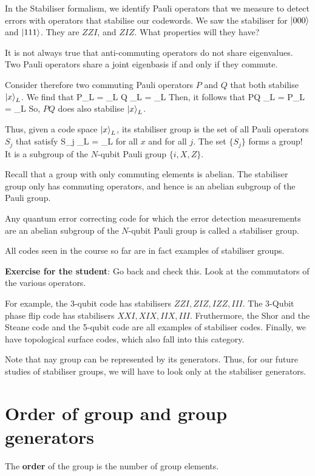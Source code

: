 In the Stabiliser formalism, we identify Pauli operators that we measure to detect errors with operators that stabilise our codewords. We saw the stabiliser for $\ket{000}$ and $\ket{111}$. They are $ZZI$, and $ZIZ$. What properties will they have? 

It is not always true that anti-commuting operators do not share eigenvalues. Two Pauli operators share a joint eigenbasis if and only if they commute. 

Consider therefore two commuting Pauli operators $P$ and $Q$ that both stabilise $\ket{x}_L$. We find that 
\beq
P_L = _L
\eeq
\beq
Q _L = _L
\eeq
Then, it follows that 
\beq
PQ _L = P_L = _L
\eeq
So, $PQ$ does also stabilise $\ket{x}_L$. 

Thus, given a code space $\ket{x}_L$, its stabiliser group is the set of all Pauli operators $S_j$ that satisfy
\beq
S_j _L = _L
\eeq
for all $x$ and for all $j$. The set $\{S_j\}$ forms a group! It is a subgroup of the $N$-qubit Pauli group $\{i, X, Z\}$. 

Recall that a group with only commuting elements is abelian. The stabiliser group only has commuting operators, and hence is an abelian subgroup of the Pauli group. 

Any quantum error correcting code for which the error detection measurements are an abelian subgroup of the $N$-qubit Pauli group is called a stabiliser group. 

All codes seen in the course so far are in fact examples of stabiliser groups. 

\textbf{Exercise for the student}: Go back and check this. Look at the commutators of the various operators. 

For example, the 3-qubit code has stabilisers $ZZI, ZIZ, IZZ, III$. The 3-Qubit phase flip code has stabilisers $XXI, XIX, IIX, III$. Fruthermore, the Shor and the Steane code and the 5-qubit code are all examples of stabiliser codes. Finally, we have topological surface codes, which also fall into this category. 

Note that nay group can be represented by its generators. Thus, for our future studies of stabiliser groups, we will have to look only at the stabiliser generators. 

\section{Order of group and group generators}
The \textbf{order} of the group is the number of group elements. 

